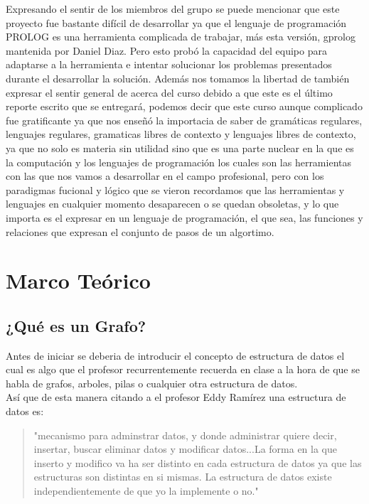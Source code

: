 \documentclass[10pt,a4paper]{article}
\begin{document}
	Expresando el sentir de los miembros del grupo se puede mencionar que este proyecto fue bastante difícil de desarrollar ya que el lenguaje de programación PROLOG es una herramienta complicada de trabajar, más esta versión, gprolog mantenida por Daniel Diaz. Pero esto probó la capacidad del equipo para adaptarse a la herramienta e intentar solucionar los problemas presentados durante el desarrollar la solución. Además nos tomamos la libertad de también  expresar el sentir general de acerca del curso debido a que este es el último reporte escrito que se entregará, podemos decir que este curso aunque complicado fue gratificante ya que nos enseñó la importacia de saber de gramáticas regulares, lenguajes regulares, gramaticas libres de contexto y lenguajes libres de contexto, ya que no solo es materia sin utilidad sino que es una parte nuclear en la que es la computación y los lenguajes de programación los cuales son las herramientas con las que nos vamos a desarrollar en el campo profesional, pero con los paradigmas fucional y lógico que se vieron recordamos que las herramientas y lenguajes en cualquier momento desaparecen o se quedan obsoletas, y lo que importa es el expresar en un lenguaje de programación, el que sea,  las funciones y relaciones que expresan el conjunto de pasos de un algortimo.    			 
\pagebreak
\section{Marco Teórico}
\subsection{¿Qué es un Grafo?}
	Antes de iniciar se deberia de introducir el concepto de estructura de datos el cual es algo que el profesor recurrentemente recuerda en clase a la hora de que se habla de grafos, arboles, pilas o cualquier otra estructura de datos.\\
	Así que de esta manera citando a el profesor Eddy Ramírez una estructura de datos es:\\
	 \begin{quotation}
	 "mecanismo para adminstrar datos, y donde administrar quiere decir, insertar, buscar eliminar datos y modificar datos...La forma en la que inserto y modifico va ha ser distinto en cada estructura de datos ya que las estructuras son distintas en si mismas. La estructura de datos existe independientemente de que yo la implemente o no."\\
	 \end{quotation}
	
\end{document}
